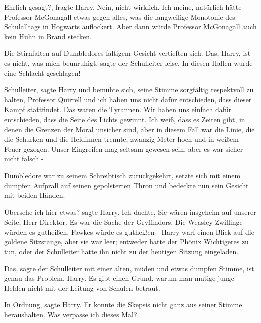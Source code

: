 \glqq Ehrlich gesagt?\grqq{}, fragte Harry. \glqq Nein, nicht wirklich. Ich
meine, natürlich hätte Professor McGonagall etwas gegen alles, was die
langweilige Monotonie des Schulalltags in Hogwarts auflockert. Aber dann würde
Professor McGonagall auch kein Huhn in Brand stecken.\grqq{}

Die Stirnfalten auf Dumbledores faltigem Gesicht vertieften sich. \glqq Das,
Harry, ist es nicht, was mich beunruhigt\grqq{}, sagte der Schulleiter leise.
\glqq In diesen Hallen wurde eine Schlacht geschlagen!\grqq{}

\glqq Schulleiter\grqq{}, sagte Harry und bemühte sich, seine Stimme sorgfältig
respektvoll zu halten, \glqq Professor Quirrell und ich haben uns nicht dafür
entschieden, dass dieser Kampf stattfindet. Das waren die Tyrannen. Wir haben
uns einfach dafür entschieden, dass die Seite des Lichts gewinnt. Ich weiß, dass
es Zeiten gibt, in denen die Grenzen der Moral unsicher sind, aber in diesem
Fall war die Linie, die die Schurken und die Heldinnen trennte, zwanzig Meter
hoch und in weißem Feuer gezogen. Unser Eingreifen mag seltsam gewesen sein,
aber es war sicher nicht falsch -\grqq{}

Dumbledore war zu seinem Schreibtisch zurückgekehrt, setzte sich mit einem
dumpfen Aufprall auf seinen gepolsterten Thron und bedeckte nun sein Gesicht mit
beiden Händen.

\glqq Übersehe ich hier etwas?\grqq{} sagte Harry. \glqq Ich dachte, Sie wären
insgeheim auf unserer Seite, Herr Direktor. Es war die Sache der Gryffindors.
Die Weasley-Zwillinge würden es gutheißen, Fawkes würde es gutheißen -\grqq{}
Harry warf einen Blick auf die goldene Sitzstange, aber sie war leer; entweder
hatte der Phönix Wichtigeres zu tun, oder der Schulleiter hatte ihn nicht zu der
heutigen Sitzung eingeladen.

\glqq Das\grqq{}, sagte der Schulleiter mit einer alten, müden und etwas dumpfen
Stimme, \glqq ist genau das Problem, Harry. Es gibt einen Grund, warum man
mutige junge Helden nicht mit der Leitung von Schulen betraut.\grqq{}

\glqq In Ordnung\grqq{}, sagte Harry. Er konnte die Skepsis nicht ganz aus
seiner Stimme heraushalten. \glqq Was verpasse ich dieses Mal?\grqq{}

